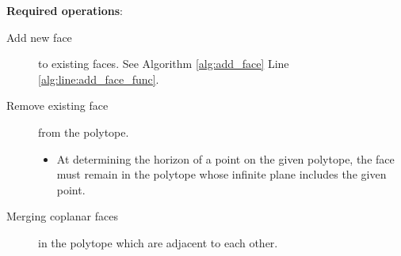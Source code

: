 \begin{itemize}









		

\end{itemize}


\textbf{Required operations}:

\begin{description}

	\item	[Add new face] to existing faces. See Algorithm \ref{alg:add_face}
		Line \ref{alg:line:add_face_func}.
	
	
	\item	[Remove existing face] from the polytope.
		\begin{itemize}
			\item	At determining the horizon of a point on the given polytope,
				the face must remain in the polytope whose infinite plane
				includes the given point.
		\end{itemize}
		
	\item	[Merging coplanar faces] in the polytope which are adjacent to each
				other.

\end{description}


\newcommand{\vara}		{$\mathcal{V}_a$}
\newcommand{\lste}		{$\mathcal{L}_e$}

